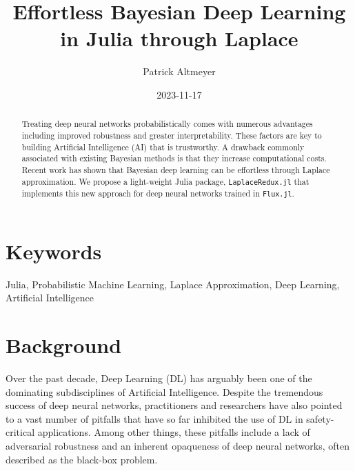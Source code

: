 \documentclass{juliacon}
\title{Effortless Bayesian Deep Learning in Julia through Laplace}
\author[1]{Patrick Altmeyer}
\affil[1]{Delft University of Technology}
\date{2023-11-17}
\providecommand{\JCONkeywords}[1]
{
  \small	
  \section*{Keywords} #1
}
\begin{document}
\maketitle

\begin{abstract}

Treating deep neural networks probabilistically comes with numerous
advantages including improved robustness and greater interpretability.
These factors are key to building Artificial Intelligence (AI) that is
trustworthy. A drawback commonly associated with existing Bayesian
methods is that they increase computational costs. Recent work has shown
that Bayesian deep learning can be effortless through Laplace
approximation. We propose a light-weight Julia package,
\texttt{LaplaceRedux.jl} that implements this new approach for deep
neural networks trained in \texttt{Flux.jl}.
\end{abstract}

\JCONkeywords{Julia, Probabilistic Machine Learning, Laplace
Approximation, Deep Learning, Artificial Intelligence}


\setcounter{page}{1}


\section{Background}\label{sec-intro}

Over the past decade, Deep Learning (DL) has arguably been one of the
dominating subdisciplines of Artificial Intelligence. Despite the
tremendous success of deep neural networks, practitioners and
researchers have also pointed to a vast number of pitfalls that have so
far inhibited the use of DL in safety-critical applications. Among other
things, these pitfalls include a lack of adversarial robustness
\cite{goodfellow2014explaining} and an inherent opaqueness of deep
neural networks, often described as the black-box problem.
\end{document}

